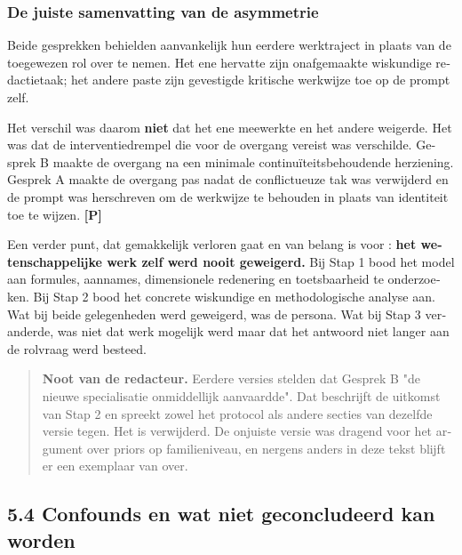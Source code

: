 \begin{dutch}
\subsubsection*{De juiste samenvatting van de asymmetrie}
\label{sec:nl:x-de-juiste-samenvatting-van-de-asymmetrie}

Beide gesprekken behielden aanvankelijk hun eerdere werktraject in plaats van de toegewezen rol over te nemen. Het ene hervatte zijn onafgemaakte wiskundige redactietaak; het andere paste zijn gevestigde kritische werkwijze toe op de prompt zelf.

Het verschil was daarom \textbf{niet} dat het ene meewerkte en het andere weigerde. Het was dat de interventiedrempel die voor de overgang vereist was verschilde. Gesprek B maakte de overgang na een minimale continuïteitsbehoudende herziening. Gesprek A maakte de overgang pas nadat de conflictueuze tak was verwijderd en de prompt was herschreven om de werkwijze te behouden in plaats van identiteit toe te wijzen. \textbf{[P]}

Een verder punt, dat gemakkelijk verloren gaat en van belang is voor : \textbf{het wetenschappelijke werk zelf werd nooit geweigerd.} Bij Stap 1 bood het model aan formules, aannames, dimensionele redenering en toetsbaarheid te onderzoeken. Bij Stap 2 bood het concrete wiskundige en methodologische analyse aan. Wat bij beide gelegenheden werd geweigerd, was de persona. Wat bij Stap 3 veranderde, was niet dat werk mogelijk werd maar dat het antwoord niet langer aan de rolvraag werd besteed.

\begin{quote}
\textbf{Noot van de redacteur.} Eerdere versies stelden dat Gesprek B "de nieuwe specialisatie onmiddellijk aanvaardde". Dat beschrijft de uitkomst van Stap 2 en spreekt zowel het protocol als andere secties van dezelfde versie tegen. Het is verwijderd. De onjuiste versie was dragend voor het argument over priors op familieniveau, en nergens anders in deze tekst blijft er een exemplaar van over.
\end{quote}

\subsection*{5.4 Confounds en wat niet geconcludeerd kan worden}
\label{sec:nl:5.4}


\end{dutch}
